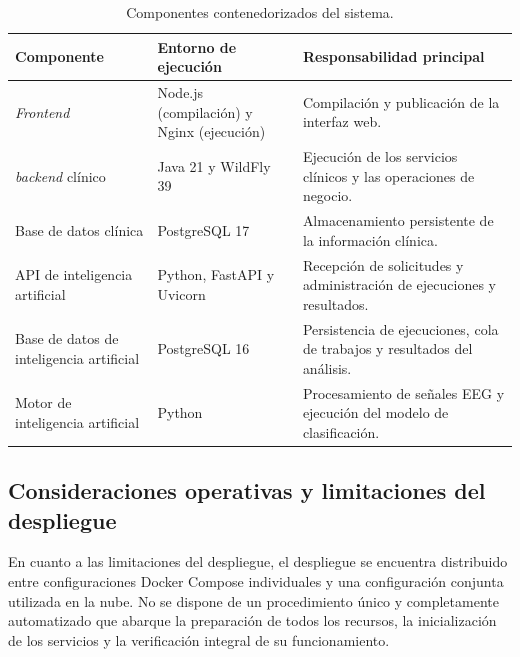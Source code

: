 \begin{table}[htbp]
    \centering
    \caption{Componentes contenedorizados del sistema.}
    \label{tab:componentes-contenedorizados}
    \small
    \begin{tabularx}{\textwidth}{|
        >{\raggedright\arraybackslash}p{}|
        >{\raggedright\arraybackslash}p{}|
        >{\raggedright\arraybackslash}X|}
        \hline
        \textbf{Componente} &
        \textbf{Entorno de ejecución} &
        \textbf{Responsabilidad principal} \\
        \hline

        \textit{Frontend} &
        Node.js (compilación) y Nginx (ejecución) &
        Compilación y publicación de la interfaz web. \\
        \hline

        \textit{backend} clínico &
        Java 21 y WildFly 39 &
        Ejecución de los servicios clínicos y las operaciones de negocio. \\
        \hline

        Base de datos clínica &
        PostgreSQL 17 &
        Almacenamiento persistente de la información clínica. \\
        \hline

        API de inteligencia artificial &
        Python, FastAPI y Uvicorn &
        Recepción de solicitudes y administración de ejecuciones y resultados. \\
        \hline

        Base de datos de inteligencia artificial &
        PostgreSQL 16 &
        Persistencia de ejecuciones, cola de trabajos y resultados del análisis. \\
        \hline

        Motor de inteligencia artificial &
        Python &
        Procesamiento de señales EEG y ejecución del modelo de clasificación. \\
        \hline
    \end{tabularx}
\end{table}

\subsection[Consideraciones operativas y limitaciones del despliegue]{Consideraciones operativas y limitaciones del \\despliegue}

En cuanto a las limitaciones del despliegue, el despliegue se encuentra distribuido entre
configuraciones Docker Compose individuales y una configuración conjunta utilizada en la nube.
No se dispone de un procedimiento único y completamente automatizado que abarque la preparación de todos los recursos, la inicialización de los servicios y la verificación integral de su funcionamiento.

